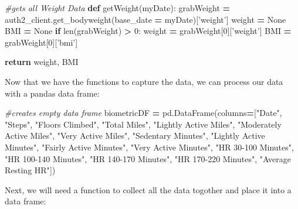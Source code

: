 \documentclass[]{book}
\newenvironment{Shaded}{\begin{snugshade}}{\end{snugshade}}
\newcommand{\KeywordTok}[1]{\textcolor[rgb]{0.13,0.29,0.53}{\textbf{#1}}}
\newcommand{\DecValTok}[1]{\textcolor[rgb]{0.00,0.00,0.81}{#1}}
\newcommand{\StringTok}[1]{\textcolor[rgb]{0.31,0.60,0.02}{#1}}
\newcommand{\CommentTok}[1]{\textcolor[rgb]{0.56,0.35,0.01}{\textit{#1}}}
\newcommand{\VariableTok}[1]{\textcolor[rgb]{0.00,0.00,0.00}{#1}}
\newcommand{\ControlFlowTok}[1]{\textcolor[rgb]{0.13,0.29,0.53}{\textbf{#1}}}
\newcommand{\OperatorTok}[1]{\textcolor[rgb]{0.81,0.36,0.00}{\textbf{#1}}}
\newcommand{\BuiltInTok}[1]{#1}
\newcommand{\NormalTok}[1]{#1}
\begin{document}
\begin{Shaded}
\begin{Highlighting}[]
\CommentTok{#gets all Weight Data}
\KeywordTok{def}\NormalTok{ getWeight(myDate):}
\NormalTok{    grabWeight }\OperatorTok{=}\NormalTok{ auth2_client.get_bodyweight(base_date }\OperatorTok{=}\NormalTok{ myDate)[}\StringTok{'weight'}\NormalTok{]}
\NormalTok{    weight }\OperatorTok{=} \VariableTok{None}
\NormalTok{    BMI }\OperatorTok{=} \VariableTok{None}
    \ControlFlowTok{if} \BuiltInTok{len}\NormalTok{(grabWeight) }\OperatorTok{>} \DecValTok{0}\NormalTok{:}
\NormalTok{        weight }\OperatorTok{=}\NormalTok{ grabWeight[}\DecValTok{0}\NormalTok{][}\StringTok{'weight'}\NormalTok{]}
\NormalTok{        BMI }\OperatorTok{=}\NormalTok{ grabWeight[}\DecValTok{0}\NormalTok{][}\StringTok{'bmi'}\NormalTok{]}
        
    \ControlFlowTok{return}\NormalTok{ weight, BMI}
\end{Highlighting}
\end{Shaded}

Now that we have the functions to capture the data, we can process our
data with a pandas data frame:

\begin{Shaded}
\begin{Highlighting}[]
\CommentTok{#creates empty data frame}
\NormalTok{biometricDF }\OperatorTok{=}\NormalTok{ pd.DataFrame(columns}\OperatorTok{=}\NormalTok{[}\StringTok{"Date"}\NormalTok{, }\StringTok{"Steps"}\NormalTok{, }\StringTok{"Floors Climbed"}\NormalTok{, }\StringTok{"Total Miles"}\NormalTok{, }\StringTok{"Lightly Active Miles"}\NormalTok{, }
                                    \StringTok{"Moderately Active Miles"}\NormalTok{, }\StringTok{"Very Active Miles"}\NormalTok{, }\StringTok{"Sedentary Minutes"}\NormalTok{, }
                                    \StringTok{"Lightly Active Minutes"}\NormalTok{, }\StringTok{"Fairly Active Minutes"}\NormalTok{, }\StringTok{"Very Active Minutes"}\NormalTok{, }
                                    \StringTok{"HR 30-100 Minutes"}\NormalTok{, }\StringTok{"HR 100-140 Minutes"}\NormalTok{, }\StringTok{"HR 140-170 Minutes"}\NormalTok{, }
                                    \StringTok{"HR 170-220 Minutes"}\NormalTok{, }\StringTok{"Average Resting HR"}\NormalTok{])}
\end{Highlighting}
\end{Shaded}

Next, we will need a function to collect all the data togother and place
it into a data frame:
\end{document}
